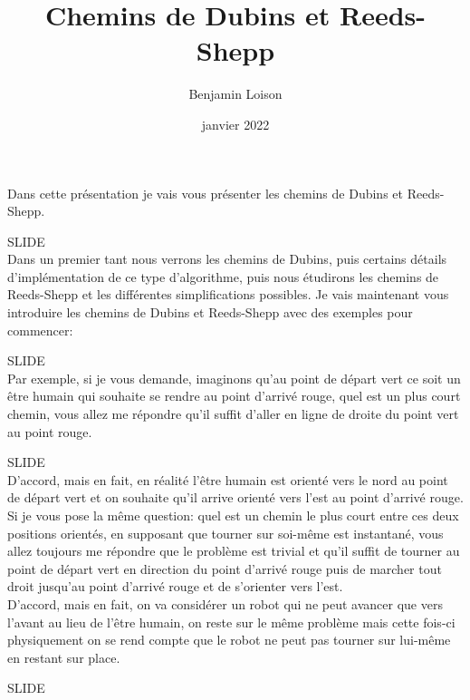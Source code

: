 \documentclass[12pt,a4paper]{article}
\newcommand{\slide}{\vspace{0.6cm}SLIDE\\}
\begin{document}
	\title{Chemins de Dubins et Reeds-Shepp}
	\author{Benjamin Loison}
	\date{janvier 2022}
	\maketitle

	\setlength{\parindent}{0cm}
	
	
	Dans cette présentation je vais vous présenter les chemins de Dubins et Reeds-Shepp.
	
	\slide
	
	Dans un premier tant nous verrons les chemins de Dubins, puis certains détails d'implémentation de ce type d'algorithme, puis nous étudirons les chemins de Reeds-Shepp et les différentes simplifications possibles.
	Je vais maintenant vous introduire les chemins de Dubins et Reeds-Shepp avec des exemples pour commencer:
	
	\slide
	
	Par exemple, si je vous demande, imaginons qu'au point de départ vert ce soit un être humain qui souhaite se rendre au point d'arrivé rouge, quel est un plus court chemin, vous allez me répondre qu'il suffit d'aller en ligne de droite du point vert au point rouge.
	
	\slide
	
	D'accord, mais en fait, en réalité l'être humain est orienté vers le nord au point de départ vert et on souhaite qu'il arrive orienté vers l'est au point d'arrivé rouge. Si je vous pose la même question: quel est un chemin le plus court entre ces deux positions orientés, en supposant que tourner sur soi-même est instantané, vous allez toujours me répondre que le problème est trivial et qu'il suffit de tourner au point de départ vert en direction du point d'arrivé rouge puis de marcher tout droit jusqu'au point d'arrivé rouge et de s'orienter vers l'est.\\
	
	
	D'accord, mais en fait, on va considérer un robot qui ne peut avancer que vers l'avant au lieu de l'être humain, on reste sur le même problème mais cette fois-ci physiquement on se rend compte que le robot ne peut pas tourner sur lui-même en restant sur place.
	
	\slide
	
\end{document}
